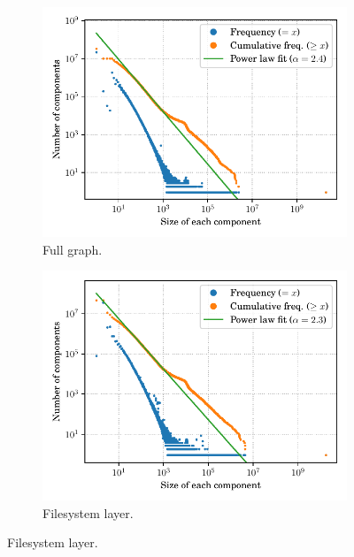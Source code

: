 \begin{figure}
    \centering
    \begin{subfigure}{.49\textwidth}
        \includegraphics[width=\linewidth]{img/topology/connectedcomponents/full}
        \caption{Full graph.}%
        \label{fig:connectedcomponents_full}
    \end{subfigure}\hfill
    \begin{subfigure}{.49\textwidth}
        \includegraphics[width=\linewidth]{img/topology/connectedcomponents/dir+cnt}
        \caption{Filesystem layer.}%
        \label{fig:connectedcomponents_dir+cnt}
    \end{subfigure}
    \newline

\end{figure}
